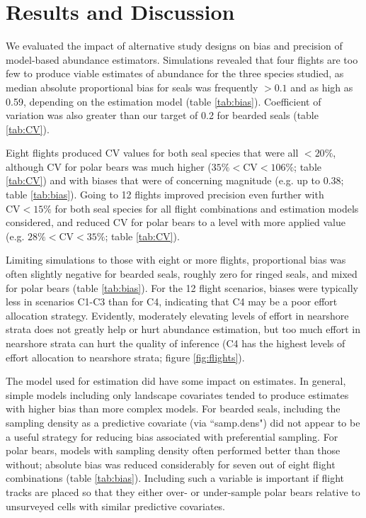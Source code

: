 \documentclass[]{rsos}%
\begin{document}
\section{Results and Discussion}

We evaluated the impact of alternative study designs on bias and precision of model-based abundance estimators. Simulations revealed that four flights are too few to produce viable estimates of abundance for the three species studied, as median absolute proportional bias for seals was frequently $>0.1$ and as high as 0.59, depending on the estimation model (table \ref{tab:bias}). Coefficient of variation was also greater than our target of 0.2 for bearded seals (table \ref{tab:CV}).

Eight flights produced CV values for both seal species that were all $<20\%$, although CV for polar bears was much higher ($35\%< \textrm{CV} < 106\%$; table \ref{tab:CV}) and with biases that were of concerning magnitude (e.g. up to 0.38; table \ref{tab:bias}).  Going to 12 flights improved precision even further with $\textrm{CV} <15\%$ for both seal species for all flight combinations and estimation models considered, and reduced CV for polar bears to a level with more applied value (e.g. $28\% < \textrm{CV} < 35\%$; table \ref{tab:CV}).

Limiting simulations to those with eight or more flights, proportional bias was often slightly negative for bearded seals, roughly zero for ringed seals, and mixed for polar bears (table \ref{tab:bias}).  For the 12 flight scenarios, biases were typically less in scenarios C1-C3 than for C4, indicating that C4 may be a poor effort allocation strategy.  Evidently, moderately elevating levels of effort in nearshore strata does not greatly help or hurt abundance estimation, but too much effort in nearshore strata can hurt the quality of inference (C4 has the highest levels of effort allocation to nearshore strata; figure \ref{fig:flights}).

The model used for estimation did have some impact on estimates.  In general, simple models including only landscape covariates tended to produce estimates with higher bias than more complex models.  For bearded seals, including the sampling density as a predictive covariate (via ``samp.dens") did not appear to be a useful strategy for reducing bias associated with preferential sampling. For polar bears, models with sampling density often performed better than those without; absolute bias was reduced considerably for seven out of eight flight combinations (table \ref{tab:bias}).  Including such a variable is important if flight tracks are placed so that they either over- or under-sample polar bears relative to unsurveyed cells with similar predictive covariates.
\end{document}
